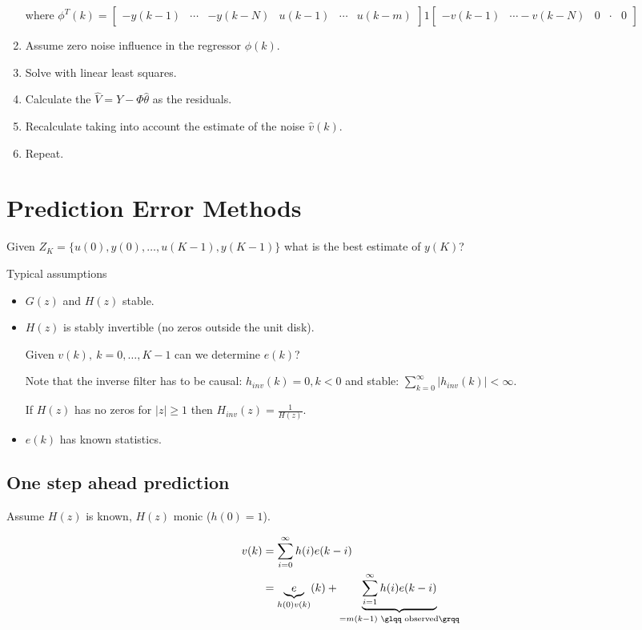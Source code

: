 \documentclass[10pt,a4paper]{scrartcl}
\begin{document}
\begin{multicols*}{2}
\begin{enumerate}
where $\phi^T(k)=\begin{bmatrix}
-y(k-1)&\cdots&-y(k-N)&u(k-1)&\cdots&u(k-m)
\end{bmatrix}1\begin{bmatrix}
-v(k-1)&\cdots -v(k-N)&0&\cdot&0
\end{bmatrix}$

\item Assume zero noise influence in the regressor $\phi(k)$.
\item Solve with linear least squares.
\item Calculate the $\hat{V} = Y-\Phi\hat{\theta}$ as the residuals.
\item Recalculate taking into account the estimate of the noise $\hat{v}(k)$.
\item Repeat.
\end{enumerate}

\section{Prediction Error Methods}


Given $Z_K=\{u(0),y(0),\ldots,u(K-1),y(K-1)\}$ what is the best estimate of $y(K)$?

Typical assumptions
\begin{itemize}
\item $G(z)$ and $H(z)$ stable.
\item $H(z)$ is stably invertible (no zeros outside the unit disk).


Given $v(k),\ k=0,\ldots,K-1$ can we determine $e(k)$?


Note that the inverse filter has to be causal: $h_{inv}(k)=0,k<0$ and stable: $\sum\limits_{k=0}^\infty|h_{inv}(k)|<\infty$.

If $H(z)$ has no zeros for $|z|\geq 1$ then $H_{inv}(z)=\frac{1}{H(z)}$.

\item $e(k)$ has known statistics.
\end{itemize}

\subsection{One step ahead prediction}

Assume $H(z)$ is known, $H(z)$ monic ($h(0) = 1$).

\begin{align*}
v(k)&=\sum\limits_{i=0}^\infty h(i)e(k-i)\\
&= \underbrace{e}_{h(0)v(k)}(k)+\underbrace{\sum\limits_{i=1}^{\infty}h(i)e(k-i)}_{=m(k-1)\text{ \glqq observed\grqq}}
\end{align*}


\end{multicols*}
\end{document}
